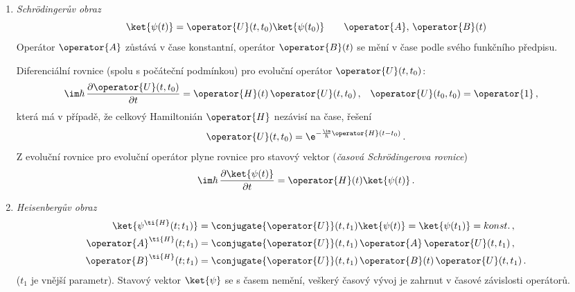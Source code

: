 \begin{enumerate}
\item
    \emph{Schrödingerův obraz}
    \begin{equation}
        \ket{\psi(t)}
            =\operator{U}(t,t_{0})\ket{\psi(t_{0})}\qquad\operator{A},\,\operator{B}(t)
    \end{equation}
    Operátor $\operator{A}$ zůstává v čase konstantní, 
    operátor $\operator{B}(t)$ se mění v čase podle svého funkčního předpisu.
    
    Diferenciální rovnice (spolu s počáteční podmínkou) pro evoluční operátor $\operator{U}(t,t_{0})$:
    \begin{align}
        \im\hbar\,\frac{\partial\operator{U}(t,t_{0})}{\partial t}
            &=\operator{H}(t)\,\operator{U}(t,t_{0})\,,
            &\operator{U}(t_{0},t_{0})
            &=\operator{1}\,,
    \end{align}
    která má v případě, že celkový Hamiltonián $\operator{H}$ nezávisí na čase, řešení
    \begin{equation}
        \operator{U}(t,t_{0})
            =\e^{-\frac{\im}{\hbar}\operator{H}(t-t_{0})}\,.
    \end{equation}
    Z evoluční rovnice pro evoluční operátor plyne rovnice pro stavový vektor (\emph{časová Schrödingerova rovnice})
    \begin{equation}
        \im\hbar\,\frac{\partial\ket{\psi(t)}}{\partial t}
            =\operator{H}(t)\ket{\psi(t)}\,.
    \end{equation}

\item\emph{Heisenbergův obraz}
    \begin{subequations}
        \begin{align}
            \ket{\psi^{\ti{H}}(t;t_{1})}
                &=\conjugate{\operator{U}}(t,t_{1})\ket{\psi(t)}
                    =\ket{\psi(t_{1})}
                    =konst.\,,\\
            \operator{A}^{\ti{H}}(t;t_{1})
                &=\conjugate{\operator{U}}(t,t_{1})\,\operator{A}\,\operator{U}(t,t_{1})\,,\\
            \operator{B}^{\ti{H}}(t;t_{1})
                &=\conjugate{\operator{U}}(t,t_{1})\,\operator{B}(t)\,\operator{U}(t,t_{1})\,.
        \end{align}            
    \end{subequations}
    ($t_{1}$ je vnější parametr).
    Stavový vektor $\ket{\psi}$ se s časem nemění, veškerý časový vývoj je zahrnut v časové závislosti operátorů.
    

\end{enumerate}
